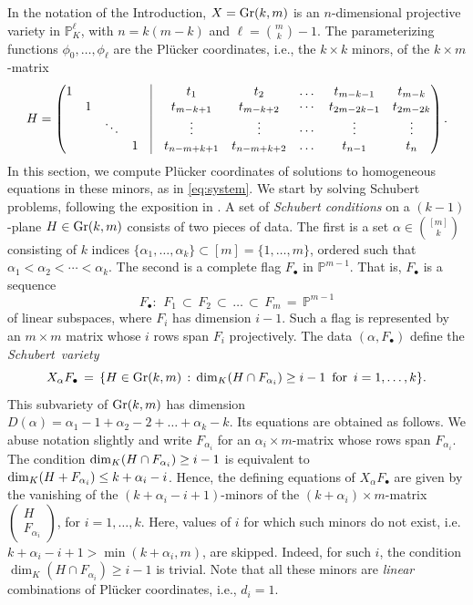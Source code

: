 \documentclass[12pt]{article}
\theoremstyle{definition}
\theoremstyle{remark}
\begin{document}
In the notation of the Introduction, $X = {\rm Gr}(k,m)$ is an $n$-dimensional projective variety in $\mathbb{P}^{\ell}_K$, with $n = k(m-k)$ and $\ell = \binom{m}{k}-1$. 
The parameterizing functions $\phi_0, \ldots, \phi_\ell$ are the Pl\"ucker coordinates, i.e., the $k \times k$ minors, of the $k \times m$-matrix
\begin{equation} \label{eq:H} H= \begin{pmatrix}
   1& & & &\vrule&   t_1 & t_2 & \dots & t_{m-k-1} & t_{m-k}  \\  & 1 & & & \vrule& t_{m-k+1} & t_{m-k+2} & \cdots & t_{2m-2k-1} & t_{2m-2k} \\ & &\ddots& & \vrule & \vdots & \vdots & \cdots & \vdots & \vdots \\ & &  & 1&\vrule& t_{n-m+k+1}& t_{n-m+k+2} & \dots & t_{n-1} & t_n    
\end{pmatrix}. 
\end{equation}
In this section, we compute Pl\"ucker coordinates of solutions to homogeneous equations in these minors, as in \eqref{eq:system}. We start by solving Schubert problems, following the exposition in \cite[Section 9.3]{sottile2011real}.
A set of \emph{Schubert conditions} on a $(k-1)$-plane $H \in {\rm Gr}(k,m)$ consists of two pieces of data. The first is a set $\alpha \in \binom{[m]}{k}$ consisting of $k$ indices $\{\alpha_1, \ldots, \alpha_k \} \subset [m]=\{1,\dots,m\}$, ordered such that $\alpha_1 < \alpha_2 < \cdots < \alpha_k$. The second is a complete flag $F_\bullet$ in $\mathbb{P}^{m-1}$. That is, $F_\bullet$ is a sequence 
\[ F_\bullet: \,  \ F_1 \, \subset \,  F_2 \, \subset \, \dots \, \subset \,  F_m \, = \, \mathbb{P}^{m-1} \]
of linear subspaces, where $F_i$ has dimension $i-1$.
Such a flag is represented by an $m\times m$ matrix whose $i$ rows span $F_i$ projectively. 
The data $(\alpha, F_\bullet)$ define the \emph{Schubert~variety}
\[ X_\alpha F_\bullet \,  = \,  \{ H\in {\rm Gr}(k,m) \, : \, {\rm dim}_K(H\cap F_{\alpha_i})\geq i-1 \ \, {\rm for} \,  \ i=1,\dots,k \}. \]
This subvariety of ${\rm Gr}(k,m)$ has dimension $D(\alpha)=\alpha_1-1+\alpha_2-2+\dots+\alpha_k-k$. 
Its equations are obtained as follows. We abuse notation slightly and write $F_{\alpha_i}$ for an $\alpha_i \times m$-matrix whose rows span $F_{\alpha_i}$.
The condition ${\rm dim}_K(H\cap F_{\alpha_i})\geq i-1 $ is equivalent to $ {\rm dim}_K(H+F_{\alpha_i})\leq k+\alpha_i-i$. Hence, the defining equations of $X_\alpha F_\bullet$ are given by the vanishing of the $(k + \alpha_i - i +1)$-minors of the $(k+\alpha_i) \times m$-matrix $\begin{pmatrix}
    H \\ F_{\alpha_i}
\end{pmatrix}$, for $i = 1, \ldots, k$. Here, values of $i$ for which such minors do not exist, i.e. $k + \alpha_i - i + 1 > \min(k+\alpha_i,m)$, are skipped. Indeed, for such $i$, the condition $\dim_K(H \cap F_{\alpha_i}) \geq i-1$ is trivial. Note that all these minors are \emph{linear} combinations of Pl\"ucker coordinates, i.e., $d_i = 1$.
\end{document}

